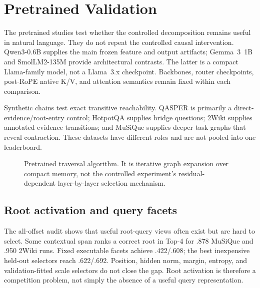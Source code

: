 \section{Pretrained Validation}

The pretrained studies test whether the controlled decomposition remains useful in natural language.
They do not repeat the controlled causal intervention.  Qwen3-0.6B supplies the main frozen feature
and output artifacts; Gemma~3~1B and SmolLM2-135M provide architectural contrasts.  The latter is a
compact Llama-family model, not a Llama~3.x checkpoint.  Backbones, router checkpoints, post-RoPE
native K/V, and attention semantics remain fixed within each comparison.

Synthetic chains test exact transitive reachability.  QASPER is primarily a direct-evidence/root-entry
control; HotpotQA supplies bridge questions; 2Wiki supplies annotated evidence transitions; and
MuSiQue supplies deeper task graphs that reveal contraction.  These datasets have different roles and
are not pooled into one leaderboard.

\begin{figure}[H]
\centering
{}
\caption{Pretrained traversal algorithm.  It is iterative graph expansion over compact memory, not
the controlled experiment's residual-dependent layer-by-layer selection mechanism.}
\label{fig:pretrained-selection-algorithm}
\end{figure}

\subsection{Root activation and query facets}

The all-offset audit shows that useful root-query views often exist but are hard to select.  Some
contextual span ranks a correct root in Top-4 for .878 MuSiQue and .950 2Wiki runs.  Fixed executable
facets achieve .422/.608; the best inexpensive held-out selectors reach .622/.692.  Position, hidden
norm, margin, entropy, and validation-fitted scale selectors do not close the gap.  Root activation is
therefore a competition problem, not simply the absence of a useful query representation.


